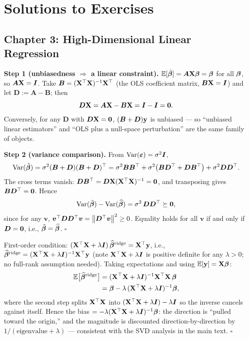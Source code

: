 \appendix
\section{Solutions to Exercises}\label{sec:solutions}

\subsection{Chapter 3: High-Dimensional Linear Regression}

\begin{description}[style=nextline, itemsep=1.2ex]
\item[Exercise \ref{ex:gm} (completing the Gauss--Markov proof)]
\textbf{Step 1 (unbiasedness $\Rightarrow$ a linear constraint).} $\mathbb{E}[\tilde{\bm{\beta}}] = \bm{A}\mathbf{X}\bm{\beta} = \bm{\beta}$ for all $\bm{\beta}$, so $\bm{A}\mathbf{X} = \bm{I}$. Take $\bm{B} = (\mathbf{X}^\top\mathbf{X})^{-1}\mathbf{X}^\top$ (the OLS coefficient matrix, $\bm{B}\mathbf{X} = \bm{I}$) and let $\bm{D} := \bm{A} - \bm{B}$; then
\[
  \bm{D}\mathbf{X} = \bm{A}\mathbf{X} - \bm{B}\mathbf{X} = \bm{I} - \bm{I} = \mathbf{0} .
\]
Conversely, for any $\bm{D}$ with $\bm{D}\mathbf{X} = \mathbf{0}$, $(\bm{B}+\bm{D})\mathbf{y}$ is unbiased --- so ``unbiased linear estimators'' and ``OLS plus a null-space perturbation'' are the same family of objects.

\textbf{Step 2 (variance comparison).} From $\mathrm{Var}(\bm{\varepsilon}) = \sigma^2\bm{I}$,
\[
  \mathrm{Var}(\tilde{\bm{\beta}}) = \sigma^2 (\bm{B}+\bm{D})(\bm{B}+\bm{D})^\top
  = \sigma^2\bm{B}\bm{B}^\top + \sigma^2\big(\bm{B}\bm{D}^\top + \bm{D}\bm{B}^\top\big) + \sigma^2\bm{D}\bm{D}^\top .
\]
The cross terms vanish: $\bm{D}\bm{B}^\top = \bm{D}\mathbf{X}(\mathbf{X}^\top\mathbf{X})^{-1} = \mathbf{0}$, and transposing gives $\bm{B}\bm{D}^\top = \mathbf{0}$. Hence
\[
  \mathrm{Var}(\tilde{\bm{\beta}}) - \mathrm{Var}(\widehat{\bm{\beta}}) = \sigma^2\,\bm{D}\bm{D}^\top \succeq \mathbf{0},
\]
since for any $\bm{v}$, $\bm{v}^\top \bm{D}\bm{D}^\top \bm{v} = \left\lVert \bm{D}^\top \bm{v} \right\rVert^2 \ge 0$. Equality holds for all $\bm{v}$ if and only if $\bm{D} = \mathbf{0}$, i.e., $\tilde{\bm{\beta}} = \widehat{\bm{\beta}}$. $\square$

\item[Exercise \ref{ex:ridge-bias} (the bias of ridge regression)]
First-order condition: $(\mathbf{X}^\top\mathbf{X} + \lambda\bm{I})\,\widehat{\bm{\beta}}^{\mathrm{ridge}} = \mathbf{X}^\top\mathbf{y}$, i.e., $\widehat{\bm{\beta}}^{\mathrm{ridge}} = (\mathbf{X}^\top\mathbf{X} + \lambda\bm{I})^{-1}\mathbf{X}^\top\mathbf{y}$ (note $\mathbf{X}^\top\mathbf{X} + \lambda\bm{I}$ is positive definite for any $\lambda > 0$; no full-rank assumption needed). Taking expectations and using $\mathbb{E}[\mathbf{y}] = \mathbf{X}\bm{\beta}$:
\[
\begin{aligned}
  \mathbb{E}\big[\widehat{\bm{\beta}}^{\mathrm{ridge}}\big]
  &= (\mathbf{X}^\top\mathbf{X} + \lambda\bm{I})^{-1}\mathbf{X}^\top\mathbf{X}\,\bm{\beta} \\
  &= \bm{\beta} - \lambda\,(\mathbf{X}^\top\mathbf{X} + \lambda\bm{I})^{-1}\bm{\beta} ,
\end{aligned}
\]
where the second step splits $\mathbf{X}^\top\mathbf{X}$ into $(\mathbf{X}^\top\mathbf{X} + \lambda\bm{I}) - \lambda\bm{I}$ so the inverse cancels against itself. Hence the bias $= -\lambda(\mathbf{X}^\top\mathbf{X} + \lambda\bm{I})^{-1}\bm{\beta}$: the direction is ``pulled toward the origin,'' and the magnitude is discounted direction-by-direction by $1/(\text{eigenvalue}+\lambda)$ --- consistent with the SVD analysis in the main text. $\square$
\end{description}

